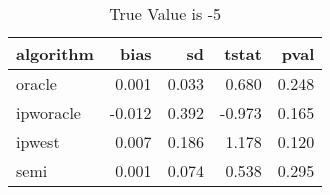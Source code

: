 \begin{table}[h!]
\caption{True Value is -5}
\centering
\begin{tabular}[t]{lrrrr}
\toprule
algorithm & bias & sd & tstat & pval\\
\midrule
oracle & 0.001 & 0.033 & 0.680 & 0.248\\
ipworacle & -0.012 & 0.392 & -0.973 & 0.165\\
ipwest & 0.007 & 0.186 & 1.178 & 0.120\\
semi & 0.001 & 0.074 & 0.538 & 0.295\\
\bottomrule
\end{tabular}
\end{table}
